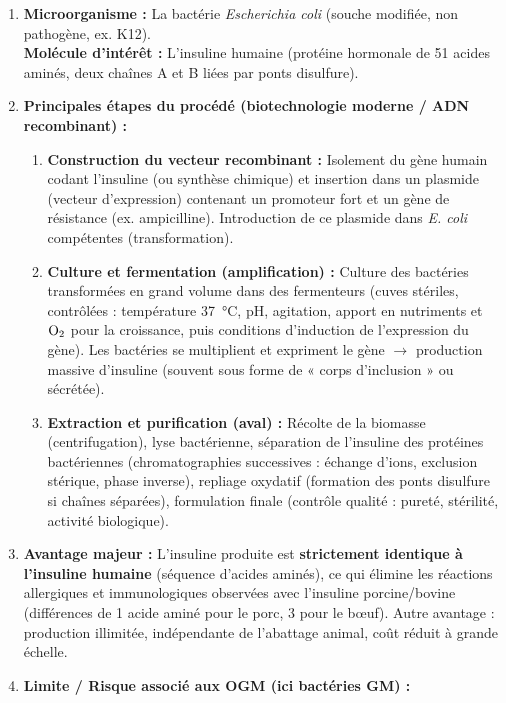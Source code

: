 \documentclass[11pt]{article}
\begin{document}
\begin{corrige}
\begin{enumerate}
\item \textbf{Microorganisme :} La bactérie \emph{Escherichia coli} (souche modifiée, non pathogène, ex. K12). \\
\textbf{Molécule d'intérêt :} L'insuline humaine (protéine hormonale de 51 acides aminés, deux chaînes A et B liées par ponts disulfure).
\item \textbf{Principales étapes du procédé (biotechnologie moderne / ADN recombinant) :}
\begin{enumerate}
\item \textbf{Construction du vecteur recombinant :} Isolement du gène humain codant l'insuline (ou synthèse chimique) et insertion dans un plasmide (vecteur d'expression) contenant un promoteur fort et un gène de résistance (ex. ampicilline). Introduction de ce plasmide dans \emph{E. coli} compétentes (transformation).
\item \textbf{Culture et fermentation (amplification) :} Culture des bactéries transformées en grand volume dans des fermenteurs (cuves stériles, contrôlées : température \SI{37}{\celsius}, pH, agitation, apport en nutriments et $\ce{O2}$ pour la croissance, puis conditions d'induction de l'expression du gène). Les bactéries se multiplient et expriment le gène $\rightarrow$ production massive d'insuline (souvent sous forme de « corps d'inclusion » ou sécrétée).
\item \textbf{Extraction et purification (aval) :} Récolte de la biomasse (centrifugation), lyse bactérienne, séparation de l'insuline des protéines bactériennes (chromatographies successives : échange d'ions, exclusion stérique, phase inverse), repliage oxydatif (formation des ponts disulfure si chaînes séparées), formulation finale (contrôle qualité : pureté, stérilité, activité biologique).
\end{enumerate}
\item \textbf{Avantage majeur :} L'insuline produite est \textbf{strictement identique à l'insuline humaine} (séquence d'acides aminés), ce qui élimine les réactions allergiques et immunologiques observées avec l'insuline porcine/bovine (différences de 1 acide aminé pour le porc, 3 pour le bœuf). Autre avantage : production illimitée, indépendante de l'abattage animal, coût réduit à grande échelle.
\item \textbf{Limite / Risque associé aux OGM (ici bactéries GM) :}

\end{enumerate}
\end{corrige}
\end{document}
